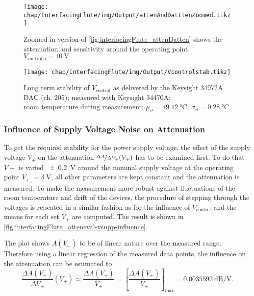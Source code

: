 \begin{figure}[H]
	\centering
	\texttt{[image: chap/InterfacingFlute/img/Output/attenAndDatttenZoomed.tikz]}
	\caption[Detailed version of \autoref{fig:interfacingFlute_attenDatten}]{Zoomed in version of \autoref{fig:interfacingFlute_attenDatten} shows the attenuation and sensitivity around the operating point $V_\text{control,o}=\SI{10}{\volt}$}
	\label{fig:interfacingFlute_attenDattenZoomed}
\end{figure}

\begin{figure}[H]
	\centering
	\texttt{[image: chap/InterfacingFlute/img/Output/Vcontrolstab.tikz]}
	\caption[Long term stability of the control voltage]{Long term stability of $V_\text{control}$ as delivered by the Keysight 34972A DAC (ch. 205); measured with Keysight 34470A;\\room temperature during measurement: $\mu_\vartheta=\SI{19.12}{\degreeCelsius}$, $\sigma_\vartheta=\SI{0.28}{\degreeCelsius}$}
	\label{fig:interfacingFlute_vcontrolstab_longterm}
\end{figure}

\subsubsection{Influence of Supply Voltage Noise on Attenuation}
To get the required stability for the power supply voltage, the effect of the supply voltage $V_+$ on the attenuation $\nicefrac{\Delta A}{\Delta V_+} (V_+)$ has to be examined first. To do that $V+$ is varied \SI{\pm0.2}{\volt} around the nominal supply voltage at the operating point $V_{+_o}=\SI{3}{\volt}$, all other parameters are kept constant and the attenuation is measured. To make the measurement more robust against fluctuations of the room temperature and drift of the devices, the procedure of stepping through the voltages is repeated in a similar fashion as for the influence of $V_\text{control}$ and the means for each set $V_+$ are computed. The result is shown in \autoref{fig:interfacingFlute_atteneval-vsupp-influence}.

The plot shows $A(V_+)$ to be of linear nature over the measured range.
Therefore using a linear regression of the measured data points, the influence on the attenuation can be estimated to
\begin{equation}
\frac{\Delta A(V_+)}{\Delta V_+}(V_+) 
\approx \frac{\Delta A(V_+)}{V_+} 
= \left[\frac{\Delta A(V_+)}{V_+}\right]_\text{max}
=\SI{0.0035592}{\dB\per\volt}.
\end{equation}

